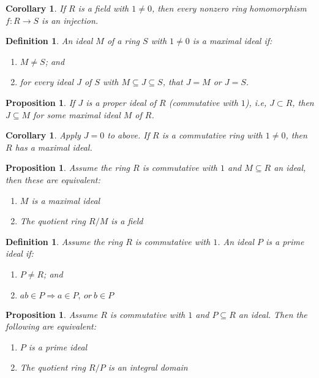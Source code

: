 \documentclass[a4paper,8pt]{article}
\newcommand{\hlt}[1]{\textit{{\color{blue}#1}}}
\theoremstyle{theorem}
\newtheorem{corollary}[theorem]{Corollary}
\newtheorem{proposition}[theorem]{Proposition}
\newtheorem{definition}[theorem]{Definition}
\begin{document}
\begin{corollary}
If $R$ is a field with $1 \neq 0$, then every nonzero ring homomorphism $f: R \rightarrow S$ is an injection.
\end{corollary}

\begin{definition}
An ideal $M$ of a ring $S$ with $1 \neq 0$ is a \hlt{maximal ideal} if:
\begin{enumerate}[label=(\roman*)]
\item $M \neq S$; and
\item for every ideal $J$ of $S$ with $M \subseteq J \subseteq S$, that $J=M$ or $J=S$.
\end{enumerate}
\end{definition}


\begin{proposition}
If $J$ is a proper ideal of $R$ (commutative with $1$), i.e, $J \subset R$, then $J \subseteq M$ for some maximal ideal $M$ of $R$.
\end{proposition}


\begin{corollary}
Apply $J=0$ to above. If $R$ is a commutative ring with 	$1 \neq 0$, then $R$ has a maximal ideal.
\end{corollary}


\begin{proposition}
Assume the ring $R$ is commutative with $1$	and $M \subseteq R$ an ideal, then these are equivalent:
\begin{enumerate}[label=(\roman*)]
\item $M$ is a maximal ideal
\item The quotient ring $R/M$ is a field
\end{enumerate}
\end{proposition}


\begin{definition}
Assume the ring $R$ is commutative with $1$. An ideal $P$ is a prime ideal if:
\begin{enumerate}[label=(\roman*)]
\item $P \neq R$; and
\item $ab \in P \Rightarrow a \in P, \ or \ b \in P$
\end{enumerate}
\end{definition}


\begin{proposition}
Assume $R$ is commutative with $1$ and $P \subseteq R$ an ideal. Then the following are equivalent:
\begin{enumerate}[label=(\roman*)]
\item $P$ is a prime ideal
\item The quotient ring $R/P$ is an integral domain
\end{enumerate}
\end{proposition}
\end{document}
